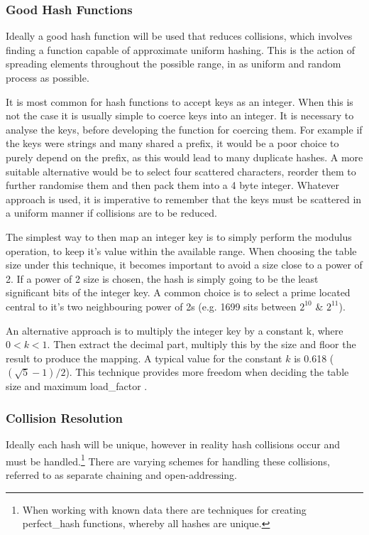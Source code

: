     \subsubsection*{Good Hash Functions}
      Ideally a good hash function will be used that reduces collisions, which involves finding a function capable of approximate uniform hashing. This is the action of spreading elements throughout the possible range, in as uniform and random process as possible.
      
      It is most common for hash functions to accept keys as an integer. When this is not the case it is usually simple to coerce keys into an integer. It is necessary to analyse the keys, before developing the function for coercing them. For example if the keys were strings and many shared a prefix, it would be a poor choice to purely depend on the prefix, as this would lead to many duplicate hashes. A more suitable alternative would be to select four scattered characters, reorder them to further randomise them and then pack them into a 4 byte integer. Whatever approach is used, it is imperative to remember that the keys must be scattered in a uniform manner if collisions are to be reduced.
      
      The simplest way to then map an integer key is to simply perform the modulus operation, to keep it's value within the available range. When choosing the table size under this technique, it becomes important to avoid a size close to a power of 2. If a power of 2 size is chosen, the hash is simply going to be the least significant bits of the integer key. A common choice is to select a prime located central to it's two neighbouring power of 2s (e.g. 1699 sits between $2^{10}$ \& $2^{11}$).
      
      An alternative approach is to  multiply the integer key by a constant k, where $0<k<1$. Then extract the decimal part, multiply this by the size and floor the result to produce the mapping. A typical value for the constant $k$ is 0.618 ($(\sqrt{5}-1)/2$). This technique provides more freedom when deciding the table size and maximum \gls{load_factor} \cite{MASTERING_ALGORITHMS}.

    \subsubsection*{Collision Resolution\label{sec:hash-collision}}        
      Ideally each hash will be unique, however in reality hash collisions occur and must be handled.\footnote{When working with known data there are techniques for creating \gls{perfect_hash} functions, whereby all hashes are unique.} There are varying schemes for handling these collisions, referred to as separate chaining and open-addressing.

